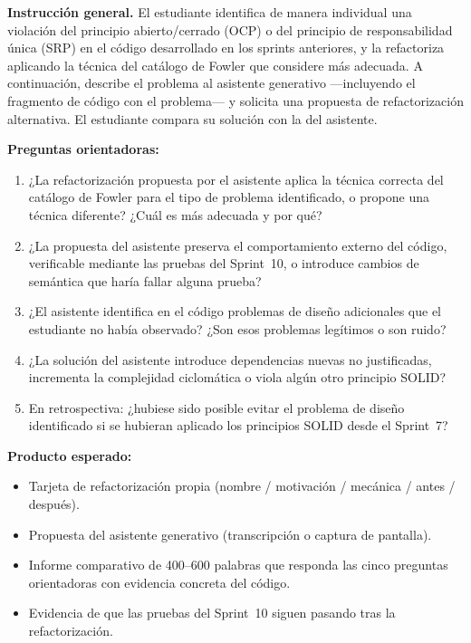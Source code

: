 \begin{tcolorbox}[actividadIA,
  title={Actividad de reflexión (Sprint~11) ---
         Software generativo y refactorización}]

\textbf{Instrucción general.}
El estudiante identifica de manera individual una violación del principio abierto/cerrado
(OCP) o del principio de responsabilidad única (SRP) en el código desarrollado en los
sprints anteriores, y la refactoriza aplicando la técnica del catálogo de Fowler que
considere más adecuada. A continuación, describe el problema al asistente generativo
---incluyendo el fragmento de código con el problema--- y solicita una propuesta de
refactorización alternativa. El estudiante compara su solución con la del asistente.

\bigskip
\textbf{Preguntas orientadoras:}
\begin{enumerate}[label=\arabic*.]
  \item ¿La refactorización propuesta por el asistente aplica la técnica correcta del
        catálogo de Fowler para el tipo de problema identificado, o propone una técnica
        diferente? ¿Cuál es más adecuada y por qué?
  \item ¿La propuesta del asistente preserva el comportamiento externo del código,
        verificable mediante las pruebas del Sprint~10, o introduce cambios de semántica
        que haría fallar alguna prueba?
  \item ¿El asistente identifica en el código problemas de diseño adicionales que el
        estudiante no había observado? ¿Son esos problemas legítimos o son ruido?
  \item ¿La solución del asistente introduce dependencias nuevas no justificadas,
        incrementa la complejidad ciclomática o viola algún otro principio SOLID?
  \item En retrospectiva: ¿hubiese sido posible evitar el problema de diseño identificado
        si se hubieran aplicado los principios SOLID desde el Sprint~7?
\end{enumerate}

\bigskip
\textbf{Producto esperado:}
\begin{itemize}
  \item Tarjeta de refactorización propia (nombre / motivación / mecánica / antes / después).
  \item Propuesta del asistente generativo (transcripción o captura de pantalla).
  \item Informe comparativo de 400--600 palabras que responda las cinco preguntas
        orientadoras con evidencia concreta del código.
  \item Evidencia de que las pruebas del Sprint~10 siguen pasando tras la refactorización.
\end{itemize}


\end{tcolorbox}
